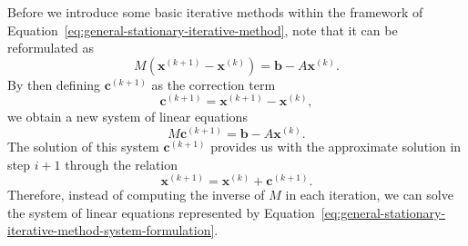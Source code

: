 Before we introduce some basic iterative methods within the framework of Equation~\eqref{eq:general-stationary-iterative-method}, note that it can be reformulated as
\begin{equation}
	M (\bm{x}^{(k+1)} - \bm{x}^{(k)}) = \bm{b} - A \bm{x}^{(k)}. 
\end{equation}
By then defining $\bm{c}^{(k+1)}$ as the correction term
\begin{equation}
	\bm{c}^{(k+1)} = \bm{x}^{(k+1)} - \bm{x}^{(k)},
\end{equation}
we obtain a new system of linear equations
\begin{equation}
	M \bm{c}^{(k+1)} = \bm{b} - A \bm{x}^{(k)}. 
	\label{eq:general-stationary-iterative-method-system-formulation}
\end{equation}
The solution of this system $\bm{c}^{(k+1)}$ provides us with the approximate solution in step $i+1$ through the relation
\begin{equation}
	\bm{x}^{(k+1)} =  \bm{x}^{(k)} + \bm{c}^{(k+1)}.
\end{equation}
Therefore, instead of computing the inverse of $M$ in each iteration, we can solve the system of linear equations represented by Equation~\eqref{eq:general-stationary-iterative-method-system-formulation}.

